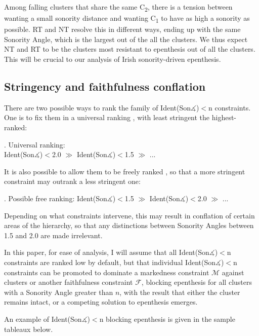 \documentclass[12pt]{article}
\begin{document}
Among falling clusters that share the same C\textsubscript{2}, there is a tension between wanting a small sonority distance and wanting C\textsubscript{1} to have as high a sonority as possible. RT and NT resolve this in different ways, ending up with the same {\sc Sonority Angle}, which is the largest out of the all the clusters. We thus expect NT and RT to be the clusters most resistant to epenthesis out of all the clusters. This will be crucial to our analysis of Irish sonority-driven epenthesis.

\subsection{Stringency and faithfulness conflation}

There are two possible ways to rank the family of {\sc Ident(Son$\measuredangle$)}$<$n constraints.
One is to fix them in a universal ranking \citep{prince.smolensky.1993}, with least stringent the highest-ranked:

\ex. Universal ranking: \\
     {\sc Ident(Son$\measuredangle$)}$<$2.0 $\gg$ {\sc Ident(Son$\measuredangle$)}$<$1.5 $\gg$ ...

It is also possible to allow them to be freely ranked \citep[and others]{de.lacy.2004}, so that a more stringent constraint may outrank a less stringent one:

\ex. Possible free ranking:
     {\sc Ident(Son$\measuredangle$)}$<$1.5 $\gg$ {\sc Ident(Son$\measuredangle$)}$<$2.0 $\gg$ ...

Depending on what constraints intervene, this may result in conflation of certain areas of the hierarchy, so that any distinctions between {\sc Sonority Angles} between 1.5 and 2.0 are made irrelevant.

\bigskip

In this paper, for ease of analysis, I will assume that all {\sc Ident(Son$\measuredangle$)}$<$n constraints are ranked low by default, but that individual {\sc Ident(Son$\measuredangle$)}$<$n constraints can be promoted to dominate a markedness constraint $\mathcal{M}$ against clusters or another faithfulness constraint $\mathcal{F}$, blocking epenthesis for all clusters with a {\sc Sonority Angle} greater than $n$, with the result that either the cluster remains intact, or a competing solution to epenthesis emerges.

An example of {\sc Ident(Son$\measuredangle$)}$<$n blocking epenthesis is given in the sample tableaux below.
\end{document}
